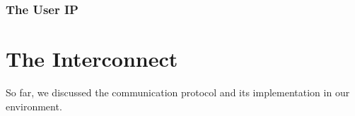 \subsubsection{The User IP}


\section{The Interconnect}

So far, we discussed the communication protocol and its implementation in our environment.



\label{sect:interconnect}


